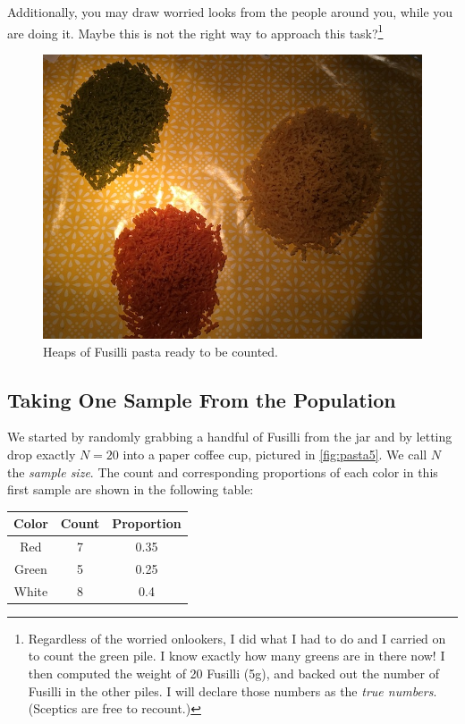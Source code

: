\documentclass[]{book}
\let\rmarkdownfootnote\footnote%
\def\footnote{\protect\rmarkdownfootnote}
\begin{document}
Additionally, you may draw worried looks from the people around you,
while you are doing it. Maybe this is not the right way to approach this
task?\footnote{Regardless of the worried onlookers, I did what I had to
  do and I carried on to count the green pile. I know exactly how many
  greens are in there now! I then computed the weight of 20 Fusilli
  (5g), and backed out the number of Fusilli in the other piles. I will
  declare those numbers as the \emph{true numbers}. (Sceptics are free
  to recount.)}

\begin{figure}

{\centering \includegraphics[width=0.9\linewidth]{images/pasta3} 

}

\caption{Heaps of Fusilli pasta ready to be counted.}\label{fig:pasta3}
\end{figure}

\subsection{Taking One Sample From the
Population}\label{taking-one-sample-from-the-population}

We started by randomly grabbing a handful of Fusilli from the jar and by
letting drop exactly \(N=20\) into a paper coffee cup, pictured in
\ref{fig:pasta5}. We call \(N\) the \emph{sample size}. The count and
corresponding proportions of each color in this first sample are shown
in the following table:

\begin{longtable}[]{@{}ccc@{}}
\toprule
Color & Count & Proportion\tabularnewline
\midrule
\endhead
Red & 7 & 0.35\tabularnewline
Green & 5 & 0.25\tabularnewline
White & 8 & 0.4\tabularnewline
\bottomrule
\end{longtable}
\end{document}
